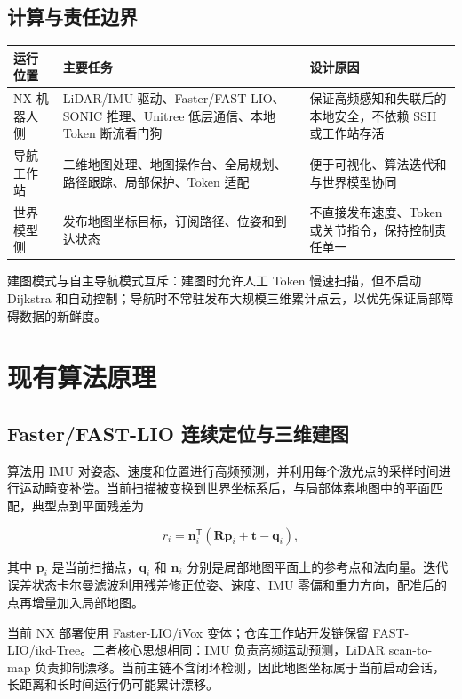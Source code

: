 \documentclass[11pt,a4paper,fontset=none]{ctexart}
\begin{document}
\subsection{计算与责任边界}

\begin{tabularx}{\textwidth}{p{2.5cm} X X}
\toprule
运行位置 & 主要任务 & 设计原因 \\
\midrule
NX 机器人侧 & LiDAR/IMU 驱动、Faster/FAST-LIO、SONIC 推理、Unitree 低层通信、本地 Token 断流看门狗 & 保证高频感知和失联后的本地安全，不依赖 SSH 或工作站存活 \\
导航工作站 & 二维地图处理、地图操作台、全局规划、路径跟踪、局部保护、Token 适配 & 便于可视化、算法迭代和与世界模型协同 \\
世界模型侧 & 发布地图坐标目标，订阅路径、位姿和到达状态 & 不直接发布速度、Token 或关节指令，保持控制责任单一 \\
\bottomrule
\end{tabularx}

建图模式与自主导航模式互斥：建图时允许人工 Token 慢速扫描，但不启动 Dijkstra 和自动控制；导航时不常驻发布大规模三维累计点云，以优先保证局部障碍数据的新鲜度。

\section{现有算法原理}

\subsection{Faster/FAST-LIO 连续定位与三维建图}

算法用 IMU 对姿态、速度和位置进行高频预测，并利用每个激光点的采样时间进行运动畸变补偿。当前扫描被变换到世界坐标系后，与局部体素地图中的平面匹配，典型点到平面残差为

\begin{equation}
r_i=\boldsymbol n_i^{\mathsf T}\left(\boldsymbol R\boldsymbol p_i+\boldsymbol t-\boldsymbol q_i\right),
\end{equation}

其中 $\boldsymbol p_i$ 是当前扫描点，$\boldsymbol q_i$ 和 $\boldsymbol n_i$ 分别是局部地图平面上的参考点和法向量。迭代误差状态卡尔曼滤波利用残差修正位姿、速度、IMU 零偏和重力方向，配准后的点再增量加入局部地图。

当前 NX 部署使用 Faster-LIO/iVox 变体；仓库工作站开发链保留 FAST-LIO/ikd-Tree。二者核心思想相同：IMU 负责高频运动预测，LiDAR scan-to-map 负责抑制漂移。当前主链不含闭环检测，因此地图坐标属于当前启动会话，长距离和长时间运行仍可能累计漂移。
\end{document}
